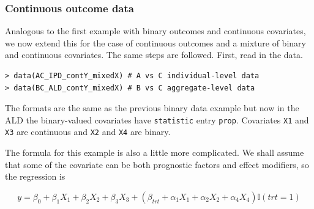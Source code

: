 \documentclass[article]{jss}
\begin{document}
\subsubsection{Continuous outcome data}
Analogous to the first example with binary outcomes and continuous covariates, we now extend this for the case of continuous outcomes and a mixture of binary and continuous covariates. The same steps are followed.
First, read in the data.

\begin{verbatim}
> data(AC_IPD_contY_mixedX) # A vs C individual-level data
> data(BC_ALD_contY_mixedX) # B vs C aggregate-level data
\end{verbatim}




The formats are the same as the previous binary data example but now in the ALD the binary-valued covariates have \texttt{statistic} entry \texttt{prop}. Covariates \texttt{X1} and \texttt{X3} are continuous and \texttt{X2} and \texttt{X4} are binary.

The formula for this example is also a little more complicated. We shall assume that some of the covariate can be both prognostic factors and effect modifiers, so the regression is

$$
y = \beta_0 + \beta_1 X_1 + \beta_2 X_2 + \beta_3 X_3 + (\beta_{trt} + \alpha_1 X_1 + \alpha_2 X_2 + \alpha_4 X_4 ) \mathbb{I}(trt = 1) 
$$
\end{document}
